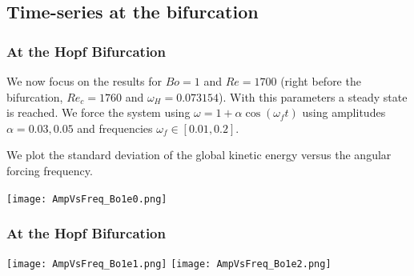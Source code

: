 \documentclass[compress]{beamer}
\begin{document}
\subsection{Time-series at the bifurcation}

\begin{frame}\frametitle{At the Hopf Bifurcation}
\vspace{2mm}
{\footnotesize
We now focus on the results for $Bo = 1$ and $Re = 1700$ (right before the bifurcation, $Re_c = 1760$ and $\omega_H = 0.073154$). With this parameters a steady state is reached. We force the system using $\omega = 1+\alpha\cos(\omega_ft)$ using amplitudes $\alpha=0.03,0.05$ and frequencies $\omega_f\in[0.01,0.2]$. 

We plot the standard deviation of the global kinetic energy versus the angular forcing frequency.}
\texttt{[image: AmpVsFreq\_Bo1e0.png]}
\end{frame}

\begin{frame}\frametitle{At the Hopf Bifurcation}
\vspace{-2mm}
\texttt{[image: AmpVsFreq\_Bo1e1.png]}
\vspace{-2mm}
\texttt{[image: AmpVsFreq\_Bo1e2.png]}
\end{frame}
\end{document}
